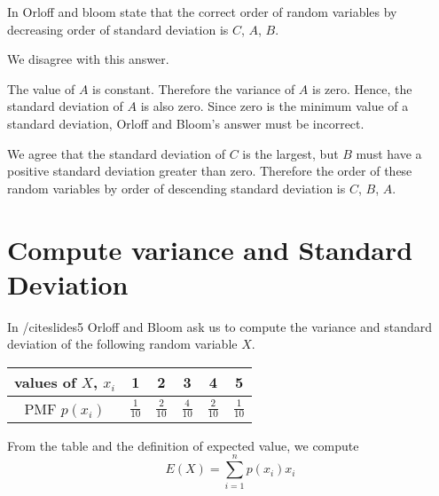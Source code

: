 \documentclass[a4paper,11pt]{article}
\begin{document}

In \cite{slides5Ans} Orloff and bloom state that the correct order of random
variables by decreasing order of standard deviation is $C$, $A$, $B$.

We disagree with this answer.

The value of $A$ is constant.  Therefore the variance of $A$ is zero.  Hence,
the standard deviation of $A$ is also zero.  Since zero is the minimum value
of a standard deviation, Orloff and Bloom's answer must be incorrect.

We agree that the standard deviation of $C$ is the largest, but $B$ must have
a positive standard deviation greater than zero.  Therefore the order of these
random variables by order of descending standard deviation is $C$, $B$, $A$.

\section{Compute variance and Standard Deviation}

In /cite{slides5} Orloff and Bloom ask us to compute the variance and standard
deviation of the following random variable $X$.

\begin{center}
\begin{tabular}{ | c | c | c |  c | c | c | }
  \hline
  values of $X$, $x_{i}$ & 1 & 2 & 3 & 4 & 5  \\ \hline
  PMF $p\left( x_i \right)$ & $\frac{1}{10}$ & $\frac{2}{10}$ & $\frac{4}{10}$
    & $\frac{2}{10}$ & $\frac{1}{10}$ \\ \hline
\end{tabular}
\end{center}

From the table and the definition of expected value, we compute
\begin{equation}
    E\left(X \right) =
      \sum_{i=1}^{n} p\left( x_{i} \right) x_i
\end{equation}
\end{document}
